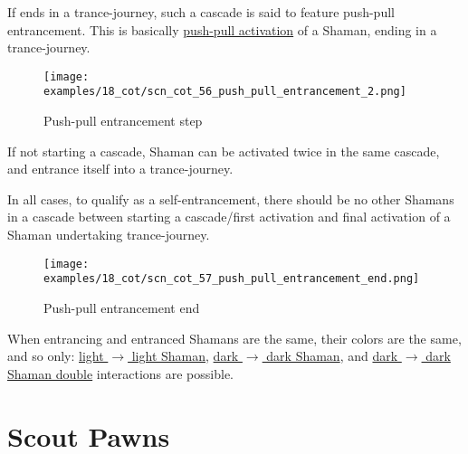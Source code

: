 If ends in a trance-journey, such a cascade is said to feature push-pull entrancement.
This is basically
\hyperref[sec:Terms/Push-pull activation]{push-pull activation} of a Shaman, ending
in a trance-journey.

\vspace*{0.05\textheight}
\noindent
\begin{wrapfigure}[11]{l}{0.4\textwidth}
\centering
\texttt{[image: examples/18\_cot/scn\_cot\_56\_push\_pull\_entrancement\_2.png]}
\caption{Push-pull entrancement step}
\label{fig:star/scn_cot_56_push_pull_entrancement_2}
\end{wrapfigure}
If not starting a cascade, Shaman can be activated twice in the same cascade, and
entrance itself into a trance-journey.

In all cases, to qualify as a self-entrancement, there should be no other Shamans
in a cascade between starting a cascade/first activation and final activation of
a Shaman undertaking trance-journey.

\clearpage %

\noindent
\begin{figure}[!h]
\texttt{[image: examples/18\_cot/scn\_cot\_57\_push\_pull\_entrancement\_end.png]}
\caption{Push-pull entrancement end}
\label{fig:scn_cot_57_push_pull_entrancement_end}
\end{figure}

When entrancing and entranced Shamans are the same, their colors are the same, and so only: \newline
\hyperref[fig:scn_cot_40_light_light_shaman_interaction_start]{light $\rightarrow$ light Shaman}, \newline
\hyperref[fig:scn_cot_44_dark_dark_shaman_interaction_start]{dark $\rightarrow$ dark Shaman}, and \newline
\hyperref[fig:scn_cot_46_dark_dark_shaman_double_interaction_start]{dark $\rightarrow$ dark Shaman double}
interactions are possible.

\clearpage %

\section*{Scout Pawns}
\label{sec:Conquest of Tlalocan/Scout Pawns}

